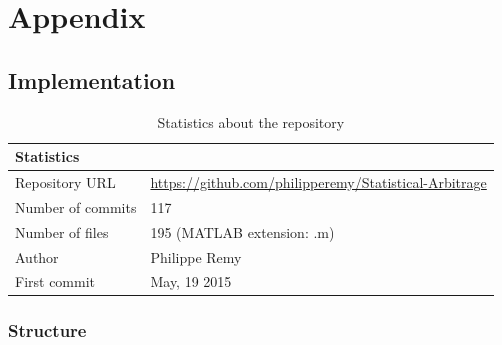 \documentclass[11pt,a4,twosided,singlespacing,titlepagenumber=on]{scrreprt}
\numberwithin{equation}{chapter} %
\theoremstyle{remark}
\begin{document}

\cleardoublepage
{}
{} %




\chapter{Appendix}

\section{Implementation}

\begin{table}[H]
\centering
\begin{tabular}{ll}
\hline
\multicolumn{1}{|l}{Statistics}     & \multicolumn{1}{l|}{} \\ \hline
Repository URL 					   &  \url{https://github.com/philipperemy/Statistical-Arbitrage} \\
Number of commits   				 &  117 \\
Number of files   				 &  195 (MATLAB extension: .m) \\
Author          &  Philippe Remy \\
First commit & May, 19 2015 \\
\hline
\end{tabular}
\caption{Statistics about the repository}
\label{Statistics_repository}
\end{table}

\subsection{Structure}
\end{document}

